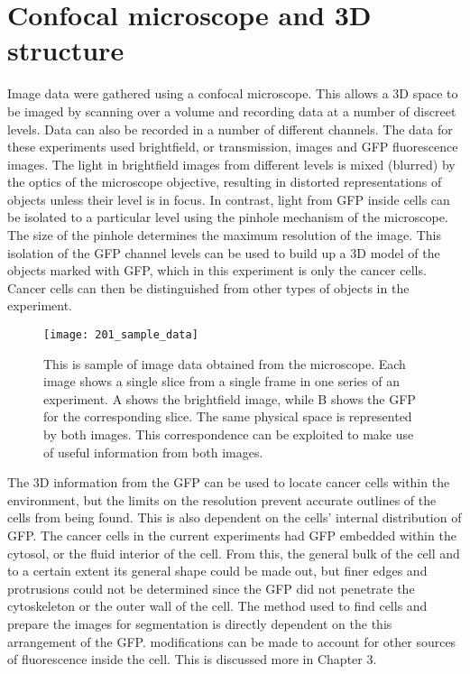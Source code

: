\section{Confocal microscope and 3D structure}

Image data were gathered using a confocal microscope. This allows a 3D space to be imaged by scanning over a volume and recording data at a number of discreet levels. Data can also be recorded in a number of different channels. The data for these experiments used brightfield, or transmission, images and GFP fluorescence images. The light in brightfield images from different levels is mixed (blurred) by the optics of the microscope objective, resulting in distorted representations of objects unless their level is in focus. In contrast, light from GFP inside cells can be isolated to a particular level using the pinhole mechanism of the microscope. The size of the pinhole determines the maximum resolution of the image. This isolation of the GFP channel levels can be used to build up a 3D model of the objects marked with GFP, which in this experiment is only the cancer cells. Cancer cells can then be distinguished from other types of objects in the experiment.

\begin{figure}[h!]
 \centering
 \texttt{[image: 201\_sample\_data]}
 \caption[Sample image data]{
 	This is sample of image data obtained from the microscope. Each image shows a single slice from a single frame in one series of an experiment. A shows the brightfield image, while B shows the GFP for the corresponding slice. The same physical space is represented by both images. This correspondence can be exploited to make use of useful information from both images.
 }
 \label{fig:sampleimagedata}
\end{figure}

The 3D information from the GFP can be used to locate cancer cells within the environment, but the limits on the resolution prevent accurate outlines of the cells from being found. This is also dependent on the cells' internal distribution of GFP. The cancer cells in the current experiments had GFP embedded within the cytosol, or the fluid interior of the cell. From this, the general bulk of the cell and to a certain extent its general shape could be made out, but finer edges and protrusions could not be determined since the GFP did not penetrate the cytoskeleton or the outer wall of the cell. The method used to find cells and prepare the images for segmentation is directly dependent on the this arrangement of the GFP. modifications can be made to account for other sources of fluorescence inside the cell. This is discussed more in Chapter 3.

